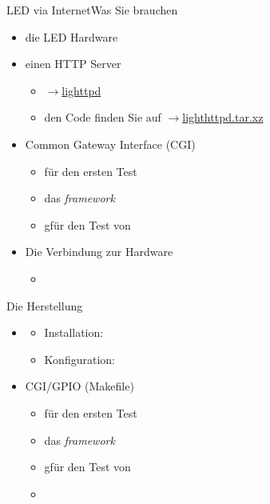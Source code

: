 \begin{frame}{LED via Internet}{Was Sie brauchen}
\begin{itemize}
 \item die LED Hardware
 \item einen HTTP Server 
 \begin{itemize}
  \item \href{https://www.lighttpd.net/}{$\to$lighttpd}
  \item den Code finden Sie auf \href{https://drive.switch.ch/index.php/s/0MfVmFD4WAeJXvS}{$\to$lighthttpd.tar.xz}
 \end{itemize}
 \item Common Gateway Interface (CGI)
 \begin{itemize}
  \item {} für den ersten Test
  \item {} das {\em framework}
  \item {} gfür den Test von 
 \end{itemize}
 \item Die Verbindung zur Hardware
 \begin{itemize}
  \item {}
 \end{itemize}
\end{itemize}
\end{frame}

\begin{frame}{Die Herstellung}
 \begin{itemize}
  \item {}
  \begin{itemize}
   \item Installation: 
   \item Konfiguration: 
  \end{itemize}
  \item CGI/GPIO (Makefile)
  \begin{itemize}
   \item {} für den ersten Test
   \item {} das {\em framework}
   \item {} gfür den Test von 
   \item {}
  \end{itemize}
 \end{itemize}
\end{frame}
